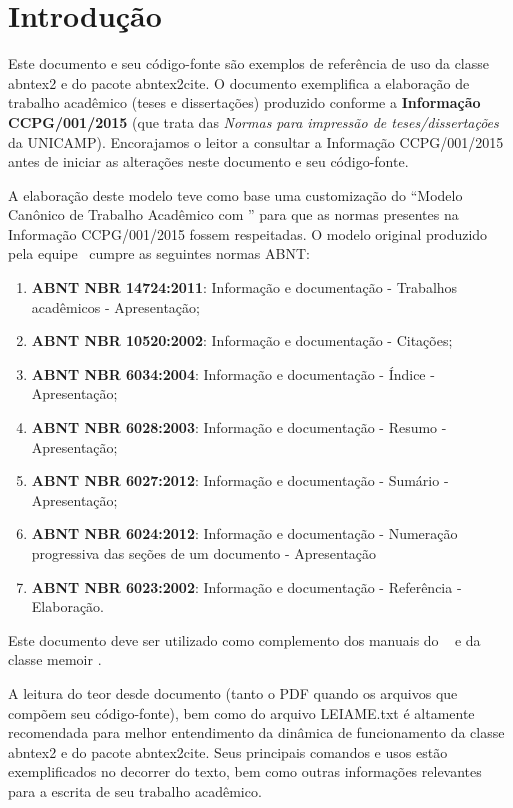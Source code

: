 \chapter*[Introdução]{Introdução}

Este documento e seu código-fonte são exemplos de referência de uso da classe
\textsf{abntex2} e do pacote \textsf{abntex2cite}. O documento exemplifica a elaboração 
de trabalho acadêmico (teses e dissertações) produzido conforme a \textbf{Informação 
CCPG/001/2015} (que trata das \emph{Normas para impressão de teses/dissertações} da 
UNICAMP). Encorajamos o leitor a consultar a Informação CCPG/001/2015 \cite{CCPG:001:2015}
antes de iniciar as alterações neste documento e seu código-fonte.

A elaboração deste modelo teve como base uma customização do ``Modelo Canônico de
Trabalho Acadêmico com \abnTeX'' \cite{abntex2modelo} para que as normas presentes na
Informação CCPG/001/2015 fossem respeitadas. O modelo original produzido pela equipe 
\abnTeX\ cumpre as seguintes normas ABNT:
\begin{enumerate}
 \item \textbf{ABNT NBR 14724:2011}: Informação e documentação - Trabalhos 
    acadêmicos - Apresentação;
 \item \textbf{ABNT NBR 10520:2002}: Informação e documentação - Citações;
 \item \textbf{ABNT NBR 6034:2004}: Informação e documentação - Índice - Apresentação;
 \item \textbf{ABNT NBR 6028:2003}: Informação e documentação - Resumo - Apresentação;
 \item \textbf{ABNT NBR 6027:2012}: Informação e documentação - Sumário - Apresentação;
 \item \textbf{ABNT NBR 6024:2012}: Informação e documentação - Numeração progressiva 
    das seções de um documento - Apresentação
 \item \textbf{ABNT NBR 6023:2002}: Informação e documentação - Referência - Elaboração.
\end{enumerate}

Este documento deve ser utilizado como complemento dos manuais do \abnTeX\ 
\cite{abntex2classe,abntex2cite,abntex2cite-alf} e da classe \textsf{memoir} \cite{memoir}.

A leitura do teor desde documento (tanto o PDF quando os arquivos que compõem seu código-fonte),
bem como do arquivo \textsf{LEIAME.txt} é altamente recomendada para melhor entendimento da 
dinâmica de funcionamento da classe \textsf{abntex2} e do pacote \textsf{abntex2cite}. Seus
principais comandos e usos estão exemplificados no decorrer do texto, bem como outras informações
relevantes para a escrita de seu trabalho acadêmico.